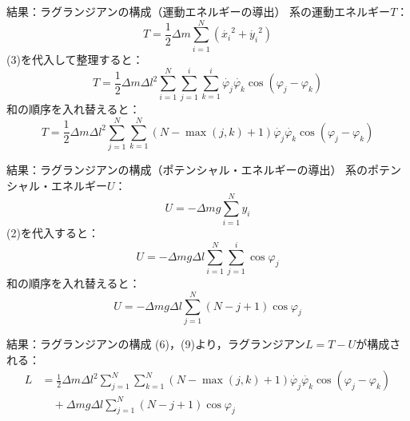 \documentclass[11pt, unicode, aspectratio=169]{beamer}
\begin{document}
\begin{frame}{結果：ラグランジアンの構成（運動エネルギーの導出）}
  系の運動エネルギー$T$：
  \begin{equation}
    T = \frac{1}{2} \Delta m \sum_{i = 1}^{N} \left(\dot{x_i}^2 + \dot{y_i}^2\right)
  \end{equation}
  (3)を代入して整理すると：
  \begin{equation}
    T = \frac{1}{2} \Delta m {\Delta l}^2
      \sum_{i = 1}^{N} \sum_{j = 1}^{i} \sum_{k = 1}^{i}
      \dot{\varphi_j} \dot{\varphi_k} \cos \left(\varphi_j - \varphi_k\right)
  \end{equation}
  和の順序を入れ替えると：
  \begin{equation}
    T = \frac{1}{2} \Delta m {\Delta l}^2
        \sum_{j = 1}^{N} \sum_{k = 1}^{N} \left(N - \max \left(j, k\right) + 1\right)
        \dot{\varphi_j} \dot{\varphi_k} \cos \left(\varphi_j - \varphi_k\right)
  \end{equation}
\end{frame}

\begin{frame}{結果：ラグランジアンの構成（ポテンシャル・エネルギーの導出）}
  系のポテンシャル・エネルギー$U$：
  \begin{equation}
    U = - \Delta m g \sum_{i = 1}^{N} y_i
  \end{equation}
  (2)を代入すると：
  \begin{equation}
    U = - \Delta m g \Delta l \sum_{i = 1}^{N} \sum_{j = 1}^{i} \cos \varphi_j
  \end{equation}
  和の順序を入れ替えると：
  \begin{equation}
    U = - \Delta m g \Delta l \sum_{j = 1}^{N} \left(N - j + 1\right) \cos \varphi_j
  \end{equation}
\end{frame}

\begin{frame}{結果：ラグランジアンの構成}
  (6)，(9)より，ラグランジアン$L = T - U$が構成される：
  \begin{equation}
    \begin{aligned}
      L &= \frac{1}{2} \Delta m {\Delta l}^2
           \sum_{j = 1}^{N} \sum_{k = 1}^{N} \left(N - \max \left(j, k\right) + 1\right)
           \dot{\varphi_j} \dot{\varphi_k} \cos \left(\varphi_j - \varphi_k\right) \\
        & \quad + \Delta m g \Delta l \sum_{j = 1}^{N} \left(N - j + 1\right) \cos \varphi_j
    \end{aligned}
  \end{equation}
\end{frame}
\end{document}
